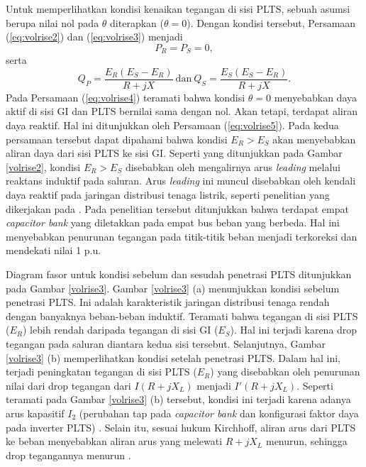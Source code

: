 {Untuk memperlihatkan kondisi kenaikan tegangan di sisi PLTS, sebuah asumsi berupa nilai nol pada $\theta$ diterapkan ($\theta=0$). Dengan kondisi tersebut, Persamaan (\ref{eq:volrise2}) dan (\ref{eq:volrise3}) menjadi
\begin{equation}\label{eq:volrise4}
	P_R = P_S = 0,
\end{equation}
serta
\begin{equation}\label{eq:volrise5}
	Q_P = \dfrac{E_R(E_S - E_R)}{R+jX} \ \text{dan}\  Q_S = \dfrac{E_S(E_S - E_R)}{R+jX}.
\end{equation}
Pada Persamaan (\ref{eq:volrise4}) teramati bahwa kondisi $\theta=0$ menyebabkan daya aktif di sisi GI dan PLTS bernilai sama dengan nol. Akan tetapi, terdapat aliran daya reaktif. Hal ini ditunjukkan oleh Persamaan (\ref{eq:volrise5}). Pada kedua persamaan tersebut dapat dipahami bahwa kondisi $E_R > E_S$ akan menyebabkan aliran daya dari sisi PLTS ke sisi GI. Seperti yang ditunjukkan pada Gambar \ref{volrise2}, kondisi $E_R > E_S$ disebabkan oleh mengalirnya arus \textit{leading} melalui reaktans induktif pada saluran. Arus \textit{leading} ini muncul disebabkan oleh kendali daya reaktif pada jaringan distribusi tenaga listrik, seperti penelitian yang dikerjakan pada \cite{Ding2017}. Pada penelitian tersebut ditunjukkan bahwa terdapat empat \textit{capacitor bank} yang diletakkan pada empat bus beban yang berbeda. Hal ini menyebabkan penurunan tegangan pada titik-titik beban menjadi terkoreksi dan mendekati nilai 1 p.u.

Diagram fasor untuk kondisi sebelum dan sesudah penetrasi PLTS ditunjukkan pada Gambar \ref{volrise3}. Gambar \ref{volrise3} (a) menunjukkan kondisi sebelum penetrasi PLTS. Ini adalah karakteristik jaringan distribusi tenaga rendah dengan banyaknya beban-beban induktif. Teramati bahwa tegangan di sisi PLTS ($E_R$) lebih rendah daripada tegangan di sisi GI ($E_S$). Hal ini terjadi karena drop tegangan pada saluran diantara kedua sisi tersebut. Selanjutnya, Gambar \ref{volrise3} (b) memperlihatkan kondisi setelah penetrasi PLTS. Dalam hal ini, terjadi peningkatan tegangan di sisi PLTS ($E_R$) \cite{Hasheminamin2015a,Mai2021} yang disebabkan oleh penurunan nilai dari drop tegangan dari $I(R+jX_L)$ menjadi $I'(R+jX_L)$. Seperti teramati pada Gambar \ref{volrise3} (b) tersebut, kondisi ini terjadi karena adanya arus kapasitif $I_2$ (perubahan tap pada \textit{capacitor bank} dan konfigurasi faktor daya pada inverter PLTS) \cite{Ding2017}. Selain itu, sesuai hukum Kirchhoff, aliran arus dari PLTS ke beban menyebabkan aliran arus yang melewati $R+jX_L$ menurun, sehingga drop tegangannya menurun \cite{Mai2021}.

}
